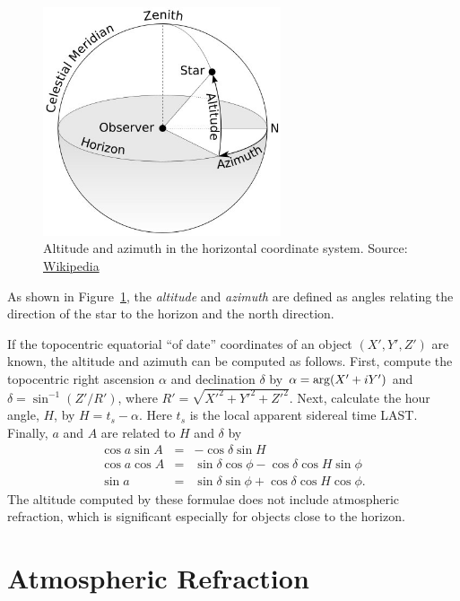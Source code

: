 \documentclass[12pt]{article}
\newcommand \beqn {\begin{eqnarray}}
\newcommand \eeqn {\end{eqnarray}}
\begin{document}
\begin{figure}[h]
\begin{center}
\includegraphics[width=7cm]{Azimuth-Altitude.jpg}
\end{center}
\caption{Altitude and azimuth in the horizontal coordinate system.
Source: \href{https://en.wikipedia.org/wiki/Horizontal_coordinate_system}{Wikipedia}}
\label{fig:horizontal}
\end{figure}

As shown in Figure~\ref{fig:horizontal}, the {\em altitude} and {\em azimuth} 
are defined as angles relating the direction of the star to the horizon and 
the north direction.

If the topocentric equatorial ``of date'' coordinates of an object $(X',Y',Z')$ 
are known, the altitude and azimuth can be computed as follows. First, compute the 
topocentric right ascension $\alpha$ and declination $\delta$ by 
$\alpha = {\rm arg}(X' + i Y')$ and $\delta = \sin^{-1}(Z'/R')$, where 
$R'=\sqrt{X'^2+Y'^2+Z'^2}$.
Next, calculate the hour angle, $H$, by $H=t_s-\alpha$. Here $t_s$ 
is the local apparent sidereal time LAST. 
Finally, $a$ and $A$ are related to $H$ and $\delta$ by 
\beqn
  \cos a \sin A &=& -\cos \delta \sin H \label{eq:aAFromHdel1} \\
  \cos a \cos A &=& \sin \delta \cos \phi - \cos \delta \cos H \sin \phi 
\label{eq:aAFromHdel2} \\
  \sin a &=& \sin \delta \sin \phi + \cos \delta \cos H \cos \phi .
\label{eq:aAFromHdel3}
\eeqn
The altitude computed by these formulae does not include atmospheric refraction, 
which is significant especially for objects close to the horizon.

\section{Atmospheric Refraction}
\end{document}
